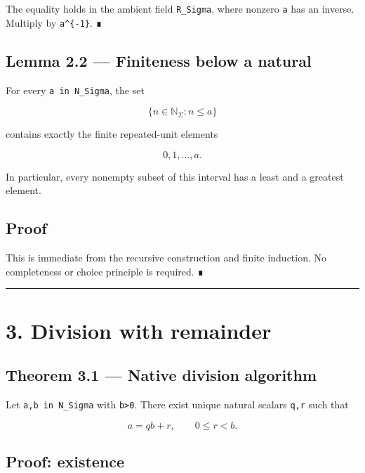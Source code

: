 The equality holds in the ambient field \texttt{R\_Sigma}, where nonzero \texttt{a} has an
inverse. Multiply by \texttt{a\^{}\{-1\}}. ∎

\hypertarget{lemma-2.2-finiteness-below-a-natural}{%
\subsection{Lemma 2.2 --- Finiteness below a natural}\label{lemma-2.2-finiteness-below-a-natural}}

For every \texttt{a\ in\ N\_Sigma}, the set

\[
\{n\in\mathbb N_\Sigma:n\le a\}
\]

contains exactly the finite repeated-unit elements

\[
0,1,\ldots,a.
\]

In particular, every nonempty subset of this interval has a least and a greatest
element.

\hypertarget{proof-1}{%
\subsection{Proof}\label{proof-1}}

This is immediate from the recursive construction and finite induction. No
completeness or choice principle is required. ∎

\begin{center}\rule{0.5\linewidth}{0.5pt}\end{center}

\hypertarget{division-with-remainder}{%
\section{3. Division with remainder}\label{division-with-remainder}}

\hypertarget{theorem-3.1-native-division-algorithm}{%
\subsection{Theorem 3.1 --- Native division algorithm}\label{theorem-3.1-native-division-algorithm}}

Let \texttt{a,b\ in\ N\_Sigma} with \texttt{b\textgreater{}0}. There exist unique natural scalars \texttt{q,r} such
that

\[
\boxed{
a=qb+r,
\qquad
0\le r<b.
}
\]

\hypertarget{proof-existence}{%
\subsection{Proof: existence}\label{proof-existence}}

